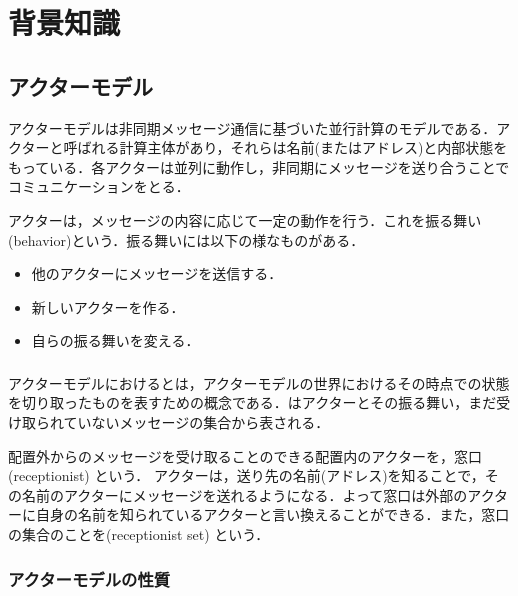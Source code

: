 \section{背景知識}


\subsection{アクターモデル}

アクターモデルは非同期メッセージ通信に基づいた並行計算のモデルである\cite[actor]{actor}．アクターと呼ばれる計算主体があり，それらは名前(またはアドレス)と内部状態をもっている．各アクターは並列に動作し，非同期にメッセージを送り合うことでコミュニケーションをとる．

アクターは，メッセージの内容に応じて一定の動作を行う．これを振る舞い(behavior)という．振る舞いには以下の様なものがある．

\begin{itemize}
  \item 他のアクターにメッセージを送信する．
  \item 新しいアクターを作る．
  \item 自らの振る舞いを変える．
\end{itemize}

\subsubsection{\conf}

アクターモデルにおける\conf とは，アクターモデルの世界におけるその時点での状態を切り取ったものを表すための概念である．\conf はアクターとその振る舞い，まだ受け取られていないメッセージの集合から表される．

配置外からのメッセージを受け取ることのできる配置内のアクターを，窓口 (receptionist) という．
アクターは，送り先の名前(アドレス)を知ることで，その名前のアクターにメッセージを送れるようになる．よって窓口は外部のアクターに自身の名前を知られているアクターと言い換えることができる．また，窓口の集合のことを\recep (receptionist set) という．


\subsubsection{アクターモデルの性質}


